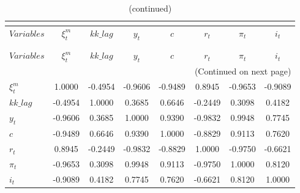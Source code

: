  
\begin{center}
\begin{longtable}{lccccccc} 
\caption{MATRIX OF CORRELATIONS}\\
 \label{Table:th_corr_matrix}\\
\toprule 
$Variables  $	 & 	 $   \xi^m_t$	 & 	 $   kk\_lag$	 & 	 $        y_t$	 & 	 $          c$	 & 	 $        r_t$	 & 	 $     \pi_t$	 & 	 $        i_t$\\
\midrule \endfirsthead 
\caption{(continued)}\\
 \toprule \\ 
$Variables  $	 & 	 $   \xi^m_t$	 & 	 $   kk\_lag$	 & 	 $        y_t$	 & 	 $          c$	 & 	 $        r_t$	 & 	 $     \pi_t$	 & 	 $        i_t$\\
\midrule \endhead 
\midrule \multicolumn{8}{r}{(Continued on next page)} \\ \bottomrule \endfoot 
\bottomrule \endlastfoot 
$\xi^m_t    $	 & 	     1.0000	 & 	    -0.4954	 & 	    -0.9606	 & 	    -0.9489	 & 	     0.8945	 & 	    -0.9653	 & 	    -0.9089 \\ 
$kk\_lag    $	 & 	    -0.4954	 & 	     1.0000	 & 	     0.3685	 & 	     0.6646	 & 	    -0.2449	 & 	     0.3098	 & 	     0.4182 \\ 
$y_t        $	 & 	    -0.9606	 & 	     0.3685	 & 	     1.0000	 & 	     0.9390	 & 	    -0.9832	 & 	     0.9948	 & 	     0.7745 \\ 
$c          $	 & 	    -0.9489	 & 	     0.6646	 & 	     0.9390	 & 	     1.0000	 & 	    -0.8829	 & 	     0.9113	 & 	     0.7620 \\ 
$r_t        $	 & 	     0.8945	 & 	    -0.2449	 & 	    -0.9832	 & 	    -0.8829	 & 	     1.0000	 & 	    -0.9750	 & 	    -0.6621 \\ 
$\pi_t      $	 & 	    -0.9653	 & 	     0.3098	 & 	     0.9948	 & 	     0.9113	 & 	    -0.9750	 & 	     1.0000	 & 	     0.8120 \\ 
$i_t        $	 & 	    -0.9089	 & 	     0.4182	 & 	     0.7745	 & 	     0.7620	 & 	    -0.6621	 & 	     0.8120	 & 	     1.0000 \\ 
\end{longtable}
 \end{center}
